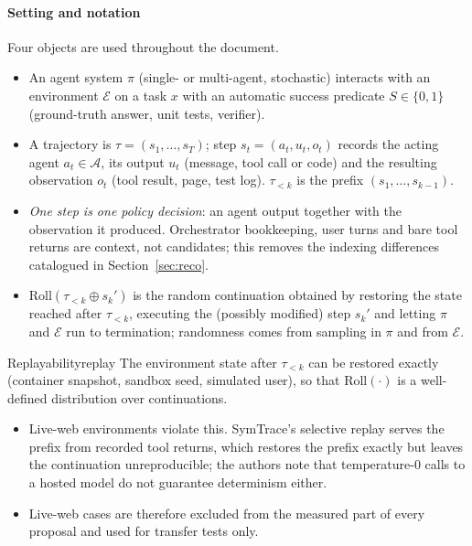 \paragraph{Setting and notation} Four objects are used throughout the document.
\begin{itemize}[leftmargin=1.1em]
\item An agent system $\pi$ (single- or multi-agent, stochastic) interacts with an environment $\mathcal{E}$ on a task $x$ with an automatic success predicate $S\in\{0,1\}$ (ground-truth answer, unit tests, verifier).
\item A trajectory is $\tau=(s_1,\dots,s_T)$; step $s_t=(a_t,u_t,o_t)$ records the acting agent $a_t\in\mathcal{A}$, its output $u_t$ (message, tool call or code) and the resulting observation $o_t$ (tool result, page, test log). $\tau_{<k}$ is the prefix $(s_1,\dots,s_{k-1})$.
\item \emph{One step is one policy decision}: an agent output together with the observation it produced. Orchestrator bookkeeping, user turns and bare tool returns are context, not candidates; this removes the indexing differences catalogued in Section~\ref{sec:reco}.
\item $\mathrm{Roll}(\tau_{<k}\oplus s_k')$ is the random continuation obtained by restoring the state reached after $\tau_{<k}$, executing the (possibly modified) step $s_k'$ and letting $\pi$ and $\mathcal{E}$ run to termination; randomness comes from sampling in $\pi$ and from $\mathcal{E}$.
\end{itemize}

\begin{assumption}{Replayability}{replay}
The environment state after $\tau_{<k}$ can be restored exactly (container snapshot, sandbox seed, simulated user), so that $\mathrm{Roll}(\cdot)$ is a well-defined distribution over continuations.
\begin{itemize}[leftmargin=1.1em]
\item Live-web environments violate this. SymTrace's selective replay \cite{luan2026symtrace} serves the prefix from recorded tool returns, which restores the prefix exactly but leaves the continuation unreproducible; the authors note that temperature-0 calls to a hosted model do not guarantee determinism either.
\item Live-web cases are therefore excluded from the measured part of every proposal and used for transfer tests only.
\end{itemize}
\end{assumption}

